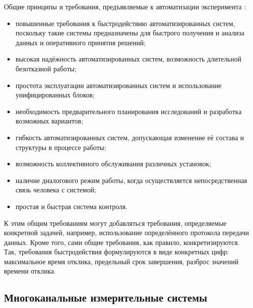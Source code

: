 \documentclass[a4paper, 14pt, titlepage]{extarticle}
\begin{document}
  Общие принципы и требования, предъявляемые к автоматизации эксперимента \cite{vinogradov-discrete, kurochkin-kamak}:
  \begin{itemize}
    \item повышенные требования к быстродействию автоматизированных систем, поскольку такие системы
      предназначены для быстрого получения и анализа данных и оперативного принятия решений;
    \item высокая надёжность автоматизированных систем, возможность длительной безотказной работы;
    \item простота эксплуатации автоматизированных систем и использование унифицированных блоков;
    \item необходимость предварительного планирования исследований и разработка возможных вариантов;
    \item гибкость автоматизированных систем, допускающая изменение её состава и структуры в процессе работы;
    \item возможность коллективного обслуживания различных установок;
    \item наличие диалогового режим работы, когда осуществляется непосредственная связь человека с системой;
    \item простая и быстрая система контроля.
  \end{itemize}

  К этим общим требованиям могут добавляться требования, определяемые конкретной задачей, например,
  использование определённого протокола передачи данных. Кроме того, сами общие требования, как
  правило, конкретизируются. Так, требования быстродействия формулируются в виде конкретных цифр:
  максимальное время отклика, предельный срок завершения, разброс значений времени отклика.

  \subsection{Многоканальные измерительные системы}
\end{document}
